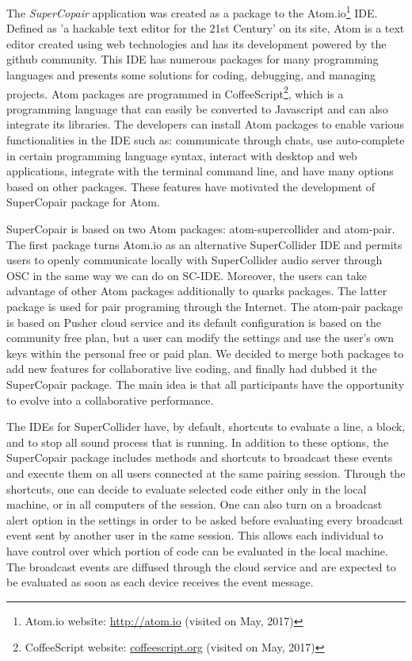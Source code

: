 The \textit{SuperCopair} application was created as a package to the Atom.io\footnote{Atom.io website: \url{http://atom.io} (visited on May, 2017)} IDE.
Defined as 'a hackable text editor for the 21st Century' on its site, Atom is a text editor created using web technologies and has its development powered by the github community.
This IDE has numerous packages for many programming languages and presents some solutions for coding, debugging, and managing projects.
Atom packages are programmed in CoffeeScript\footnote{CoffeeScript website: \url{coffeescript.org} (visited on May, 2017)}, which is a programming language that can easily be converted to Javascript and can also integrate its libraries.
The developers can install Atom packages to enable various functionalities in the IDE such as: communicate through chats, use auto-complete in certain programming language syntax, interact with desktop and web applications, integrate with the terminal command line, and have many options based on other packages.
These features have motivated the development of SuperCopair package for Atom.

SuperCopair is based on two Atom packages: atom-supercollider and atom-pair.
The first package turns Atom.io as an alternative SuperCollider IDE and permits users to openly communicate locally with SuperCollider audio server through OSC in the same way we can do on SC-IDE.
Moreover, the users can take advantage of other Atom packages additionally to quarks packages.
The latter package is used for pair programing through the Internet.
The atom-pair package is based on Pusher cloud service and its default configuration is based on the community free plan, but a user can modify the settings and use the user’s own keys within the personal free or paid plan. 
We decided to merge both packages to add new features for collaborative live coding, and finally had dubbed it the SuperCopair package.
The main idea is that all participants have the opportunity to evolve into a collaborative performance.

The IDEs for SuperCollider have, by default, shortcuts to evaluate a line, a block, and to stop all sound process that is running.
In addition to these options, the SuperCopair package includes methods and shortcuts to broadcast these events and execute them on all users connected at the same pairing session.
Through the shortcuts, one can decide to evaluate selected code either only in the local machine, or in all computers of the session.
One can also turn on a broadcast alert option in the settings in order to be asked before evaluating every broadcast event sent by another user in the same session. 
This allows each individual to have control over which portion of code can be evaluated in the local machine.
The broadcast events are diffused through the cloud service and are expected to be evaluated as soon as each device receives the event message.

